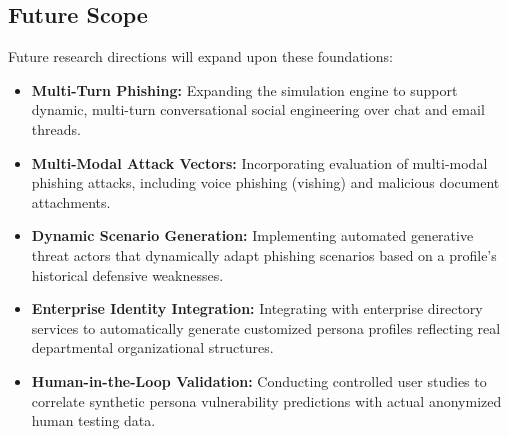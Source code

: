 \documentclass[conference,letterpaper]{IEEEtran}
\begin{document}
\subsection{Future Scope}
Future research directions will expand upon these foundations:
\begin{itemize}
    \item \textbf{Multi-Turn Phishing:} Expanding the simulation engine to support dynamic, multi-turn conversational social engineering over chat and email threads.
    \item \textbf{Multi-Modal Attack Vectors:} Incorporating evaluation of multi-modal phishing attacks, including voice phishing (vishing) and malicious document attachments.
    \item \textbf{Dynamic Scenario Generation:} Implementing automated generative threat actors that dynamically adapt phishing scenarios based on a profile's historical defensive weaknesses.
    \item \textbf{Enterprise Identity Integration:} Integrating with enterprise directory services to automatically generate customized persona profiles reflecting real departmental organizational structures.
    \item \textbf{Human-in-the-Loop Validation:} Conducting controlled user studies to correlate synthetic persona vulnerability predictions with actual anonymized human testing data.
\end{itemize}
\end{document}
